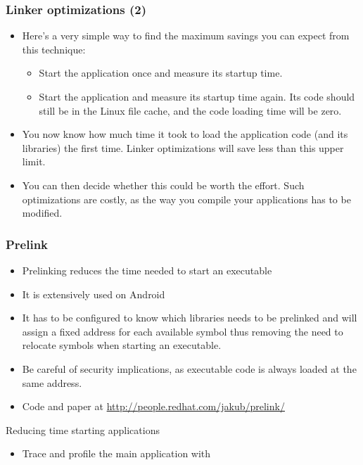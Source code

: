 \begin{frame}
\frametitle{Linker optimizations (2)}
\begin{itemize}
\item Here's a very simple way to find the maximum savings you can expect
      from this technique:
      \begin{itemize}
      \item Start the application once and measure its startup time.
      \item Start the application and measure its startup time again.
            Its code should still be in the Linux file cache,
            and the code loading time will be zero.
      \end{itemize}
\item You now know how much time it took to load the application code
      (and its libraries) the first time. Linker optimizations will
      save less than this upper limit.
\item You can then decide whether this could be worth the effort.
      Such optimizations are costly, as the way you compile your
      applications has to be modified.
\end{itemize}
\end{frame}


\begin{frame}
\frametitle{Prelink}
\begin{itemize}
\item Prelinking reduces the time needed to start an executable
\item It is extensively used on Android
\item It has to be configured to know which libraries needs to be
      prelinked and will assign a fixed address for each available
      symbol thus removing the need to relocate symbols when starting
      an executable.
\item Be careful of security implications, as executable code is
      always loaded at the same address.
\item Code and paper at
      \url{http://people.redhat.com/jakub/prelink/}
\end{itemize}
\end{frame}

\setuplabframe
{Reducing time starting applications}
{
\begin{itemize}
\item Trace and profile the main application with 
\end{itemize}
}

